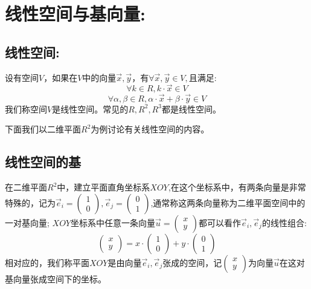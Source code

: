 \documentclass[UTF8]{article}
\begin{document}
 

\section{线性空间与基向量:}
\subsection{线性空间:}

设有空间$V$，如果在$V$中的向量$\vec{x}, \vec{y}$，有$\forall \vec{x}, \vec{y} \in V,$且满足:
$$\forall k \in R, k\cdot \vec{x} \in V$$
$$\forall \alpha,\beta \in R, \alpha\cdot \vec{x} + \beta\cdot\vec{y} \in V$$
我们称空间$V$是线性空间。常见的$R, R^2, R^3$都是线性空间。

下面我们以二维平面$R^2$为例讨论有关线性空间的内容。

\subsection{线性空间的基} 
在二维平面$R^2$中，建立平面直角坐标系$XOY$,在这个坐标系中，有两条向量是非常特殊的，记为$\vec{e}_i = 
\left(
\begin{array}{l}
1 \\ 
0
\end{array}
\right),
\vec{e}_j = 
\left(
\begin{array}{l}
0 \\ 
1
\end{array}
\right)$,通常称这两条向量称为二维平面空间中的一对基向量;
$XOY$坐标系中任意一条向量$\vec{u} = 
\left(
\begin{array}{l}
x \\ 
y
\end{array}
\right)
$都可以看作$\vec{e}_i, \vec{e}_j$的线性组合:
$$
\left(
\begin{array}{l}
x \\ 
y
\end{array}
\right) = x\cdot
\left(
\begin{array}{l}
1 \\ 
0
\end{array}
\right) + y\cdot
\left(
\begin{array}{l}
0 \\ 
1
\end{array}
\right)
$$
相对应的，我们称平面$XOY$是由向量$\vec{e}_i, \vec{e}_j$张成的空间，记$
\left(
\begin{array}{l}
x \\ 
y
\end{array}
\right)
$为向量$\vec{u}$在这对基向量张成空间下的坐标。
\end{document}
